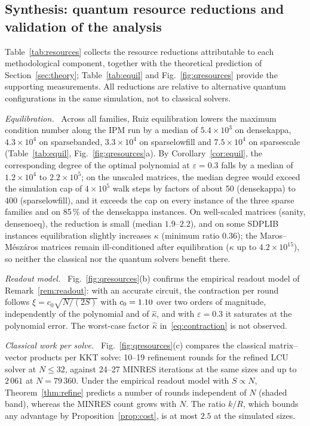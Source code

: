 \documentclass[11pt]{article}
\theoremstyle{definition}
\newcommand{\kh}{\hat\kappa}
\newcommand{\eps}{\varepsilon}
\newcommand{\dsus}{\textunderscore\penalty5000\hskip0pt\relax}
\newcommand{\ds}[1]{{\ttfamily\let\_\dsus#1}}
\newcommand{\lead}[1]{\emph{#1}\ }
\begin{document}
\subsection{Synthesis: quantum resource reductions and validation of the analysis}\label{sec:qresources}
Table~\ref{tab:resources} collects the resource reductions attributable to each methodological component, together with the theoretical prediction of Section~\ref{sec:theory}; Table~\ref{tab:equil} and Fig.~\ref{fig:qresources} provide the supporting measurements. All reductions are relative to alternative quantum configurations in the same simulation, not to classical solvers.

\lead{Equilibration.} Across all families, Ruiz equilibration lowers the maximum condition number along the IPM run by a median of $5.4\times10^{3}$ on \ds{dense\_kappa}, $4.3\times10^{4}$ on \ds{sparse\_banded}, $3.3\times10^{4}$ on \ds{sparse\_lowfill} and $7.5\times10^{4}$ on \ds{sparse\_scale} (Table~\ref{tab:equil}, Fig.~\ref{fig:qresources}a). By Corollary~\ref{cor:equil}, the corresponding degree of the optimal polynomial at $\eps=0.3$ falls by a median of $1.2\times10^{4}$ to $2.2\times10^{5}$; on the unscaled matrices, the median degree would exceed the simulation cap of $4\times10^{5}$ walk steps by factors of about 50 (\ds{dense\_kappa}) to 400 (\ds{sparse\_lowfill}), and it exceeds the cap on every instance of the three sparse families and on 85\,\% of the \ds{dense\_kappa} instances. On well-scaled matrices (\ds{sanity}, \ds{dense\_noeq}), the reduction is small (median $1.9$--$2.2$), and on some SDPLIB instances equilibration slightly increases $\kappa$ (minimum ratio $0.36$); the Maros--M\'esz\'aros matrices remain ill-conditioned after equilibration ($\kappa$ up to $4.2\times10^{15}$), so neither the classical nor the quantum solvers benefit there.

\lead{Readout model.} Fig.~\ref{fig:qresources}(b) confirms the empirical readout model of Remark~\ref{rem:readout}: with an accurate circuit, the contraction per round follows $\xi=c_0\sqrt{N/(2S)}$ with $c_0=1.10$ over two orders of magnitude, independently of the polynomial and of $\kh$, and with $\eps=0.3$ it saturates at the polynomial error. The worst-case factor $\kh$ in~\eqref{eq:contraction} is not observed.

\lead{Classical work per solve.} Fig.~\ref{fig:qresources}(c) compares the classical matrix--vector products per KKT solve: 10--19 refinement rounds for the refined LCU solver at $N\le32$, against 24--27 MINRES iterations at the same sizes and up to $2\,061$ at $N=79\,360$. Under the empirical readout model with $S\propto N$, Theorem~\ref{thm:refine} predicts a number of rounds independent of $N$ (shaded band), whereas the MINRES count grows with $N$. The ratio $k/R$, which bounds any advantage by Proposition~\ref{prop:cost}, is at most $2.5$ at the simulated sizes.
\end{document}

